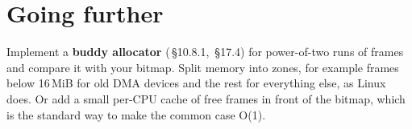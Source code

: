 \documentclass[11pt,a4paper]{article}
\begin{document}
\section{Going further}

Implement a \textbf{buddy allocator} (\OSC\,\S10.8.1, \OSTEP\,\S17.4) for power-of-two runs of frames and compare it
with your bitmap. Split memory into zones, for example frames below 16\,MiB for old DMA devices and the rest for
everything else, as Linux does. Or add a small per-CPU cache of free frames in front of the bitmap, which is the
standard way to make the common case O(1).

\booklegend
\end{document}
